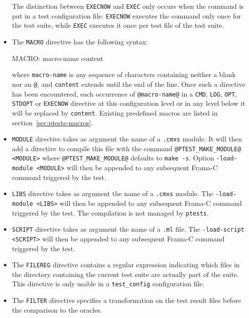 \begin{itemize}
  The distinction between \texttt{EXECNOW} and \texttt{EXEC} only occurs when
  the command is put in a test configuration file:
  \texttt{EXECNOW} executes the command only once for the test suite, while
  \texttt{EXEC} executes it once per test file of the test suite.
\item The \texttt{MACRO} directive
  has the following syntax:
  \begin{code}
    MACRO: macro-name content
  \end{code}
  where \texttt{macro-name} is any sequence of characters containing neither
  a blank nor an \texttt{@}, and \texttt{content} extends until the end of the
  line. Once such a directive has been encountered, each occurrence of
  \texttt{@macro-name@} in a \texttt{CMD}, \texttt{LOG}, \texttt{OPT},
  \texttt{STDOPT} or \texttt{EXECNOW} directive at this configuration level
  or in any level below it will be replaced by \texttt{content}. Existing
  predefined macros are listed in section~\ref{sec:ptests-macros}.
\item \texttt{MODULE}
 directive takes as argument the name of a \texttt{.cmxs}
  module. It will then add a directive to compile this file with the
  command \texttt{@PTEST\_MAKE\_MODULE@ <MODULE>} where
  \texttt{@PTEST\_MAKE\_MODULE@} defaults to \texttt{make -s}. Option
  \texttt{-load-module <MODULE>} will then be appended to any subsequent Frama-C
  command triggered by the test.
\item \texttt{LIBS}
 directive takes as argument the name of a \texttt{.cmxs}
  module. The \texttt{-load-module <LIBS>} will then be appended to any subsequent Frama-C command triggered by the test. The compilation is not managed by \texttt{ptests}.
\item \texttt{SCRIPT}
 directive takes as argument the name of a \texttt{.ml}
 file. The \texttt{-load-script <SCRIPT>} will then be appended to any subsequent Frama-C command triggered by the test.
\item The \texttt{FILEREG}
  directive contains a regular expression indicating which files in
  the directory containing the current test suite are actually part of
  the suite. This directive is only
  usable in a \texttt{test\_config}
  configuration file.
\item The \texttt{FILTER} directive specifies
  a transformation on the test result files before the comparison to the oracles.

\end{itemize}
